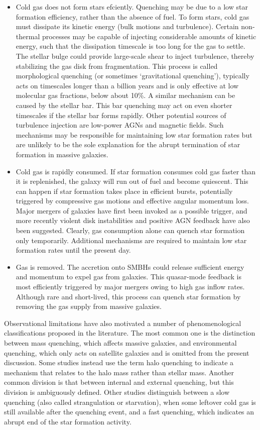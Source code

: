 \documentclass[a4paper,11pt]{article}
\begin{document}
\begin{itemize}
    \item Cold gas does not form stars efciently. Quenching may be due to a low star formation efficiency, rather than the absence of fuel. To form stars, cold gas must dissipate its kinetic energy (bulk motions and turbulence). Certain non-thermal processes may be capable of injecting considerable amounts of kinetic energy, such that the dissipation timescale is too long for the gas to settle. The stellar bulge could provide large-scale shear to inject turbulence, thereby stabilizing the gas disk from fragmentation. This process is called morphological quenching (or sometimes `gravitational quenching'), typically acts on timescales longer than a billion years and is only effective at low molecular gas fractions, below about 10\%. A similar mechanism can be caused by the stellar bar. This bar quenching may act on even shorter timescales if the stellar bar forms rapidly. Other potential sources of turbulence injection are low-power AGNs and magnetic fields. Such mechanisms may be responsible for maintaining low star formation rates but are unlikely to be the sole explanation for the abrupt termination of star formation in massive galaxies.
    \item Cold gas is rapidly consumed. If star formation consumes cold gas faster than it is replenished, the galaxy will run out of fuel and become quiescent. This can happen if star formation takes place in efficient bursts, potentially triggered by compressive gas motions and effective angular momentum loss. Major mergers of galaxies have first been invoked as a possible trigger, and more recently violent disk instabilities and positive AGN feedback have also been suggested. Clearly, gas consumption alone can quench star formation only temporarily. Additional mechanisms are required to maintain low star formation rates until the present day.
    \item Gas is removed. The accretion onto SMBHs could release sufficient energy and momentum to expel gas from galaxies. This quasar-mode feedback is most efficiently triggered by major mergers owing to high gas inflow rates. Although rare and short-lived, this process can quench star formation by removing the gas supply from massive galaxies.
\end{itemize}

{\noindent}Observational limitations have also motivated a number of phenomenological classifications proposed in the literature. The most common one is the distinction between mass quenching, which affects massive galaxies, and environmental quenching, which only acts on satellite galaxies and is omitted from the present discussion. Some studies instead use the term halo quenching to indicate a mechanism that relates to the halo mass rather than stellar mass. Another common division is that between internal and external quenching, but this division is ambiguously defined. Other studies distinguish between a slow quenching (also called strangulation or starvation), when some leftover cold gas is still available after the quenching event, and a fast quenching, which indicates an abrupt end of the star formation activity.
\end{document}
